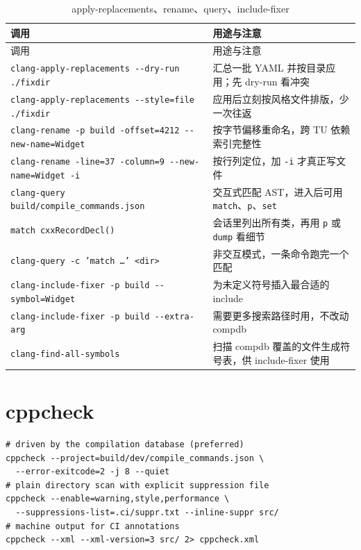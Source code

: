 \documentclass[12pt,a4paper,fontset=fandol]{ctexbook}
\newcommand{\Opt}[1]{\texttt{-\/-#1}}
\begin{document}
{\footnotesize
\begin{longtable}{@{}>{\raggedright\arraybackslash}p{}
                  >{\raggedright\arraybackslash}p{}@{}}
\caption{apply-replacements、rename、query、include-fixer}\label{tab:appB-refac}\\
\toprule
调用 & 用途与注意 \\
\midrule
\endfirsthead
\toprule
调用 & 用途与注意 \\
\midrule
\endhead
\bottomrule
\endlastfoot
\texttt{clang-apply-replacements \Opt{dry-run} ./fixdir} & 汇总一批 YAML 并按目录应用；先 dry-run 看冲突 \\
\texttt{clang-apply-replacements \Opt{style=file} ./fixdir} & 应用后立刻按风格文件排版，少一次往返 \\
\texttt{clang-rename -p build -offset=4212 \Opt{new-name=Widget}} & 按字节偏移重命名，跨 TU 依赖索引完整性 \\
\texttt{clang-rename -line=37 -column=9 \Opt{new-name=Widget} -i} & 按行列定位，加 \texttt{-i} 才真正写文件 \\
\texttt{clang-query build/compile\_\allowbreak commands.json} & 交互式匹配 AST，进入后可用 \texttt{match}、\texttt{p}、\texttt{set} \\
\texttt{match cxxRecordDecl()} & 会话里列出所有类，再用 \texttt{p} 或 \texttt{dump} 看细节 \\
\texttt{clang-query -c 'match \ldots' <dir>} & 非交互模式，一条命令跑完一个匹配 \\
\texttt{clang-include-fixer -p build \Opt{symbol=Widget}} & 为未定义符号插入最合适的 include \\
\texttt{clang-include-fixer -p build \Opt{extra-arg}} & 需要更多搜索路径时用，不改动 compdb \\
\texttt{clang-find-\allowbreak all-symbols} & 扫描 compdb 覆盖的文件生成符号表，供 include-fixer 使用 \\
\end{longtable}
}

\section{cppcheck}\label{sec:appB-s5}

\begin{lstlisting}[style=shellstyle,caption={cppcheck 的两种输入方式与抑制}]
# driven by the compilation database (preferred)
cppcheck --project=build/dev/compile_commands.json \
  --error-exitcode=2 -j 8 --quiet
# plain directory scan with explicit suppression file
cppcheck --enable=warning,style,performance \
  --suppressions-list=.ci/suppr.txt --inline-suppr src/
# machine output for CI annotations
cppcheck --xml --xml-version=3 src/ 2> cppcheck.xml
\end{lstlisting}
\end{document}
